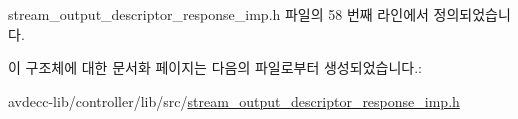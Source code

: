 stream\+\_\+output\+\_\+descriptor\+\_\+response\+\_\+imp.\+h 파일의 58 번째 라인에서 정의되었습니다.



이 구조체에 대한 문서화 페이지는 다음의 파일로부터 생성되었습니다.\+:\begin{DoxyCompactItemize}
\item 
avdecc-\/lib/controller/lib/src/\hyperlink{stream__output__descriptor__response__imp_8h}{stream\+\_\+output\+\_\+descriptor\+\_\+response\+\_\+imp.\+h}\end{DoxyCompactItemize}
